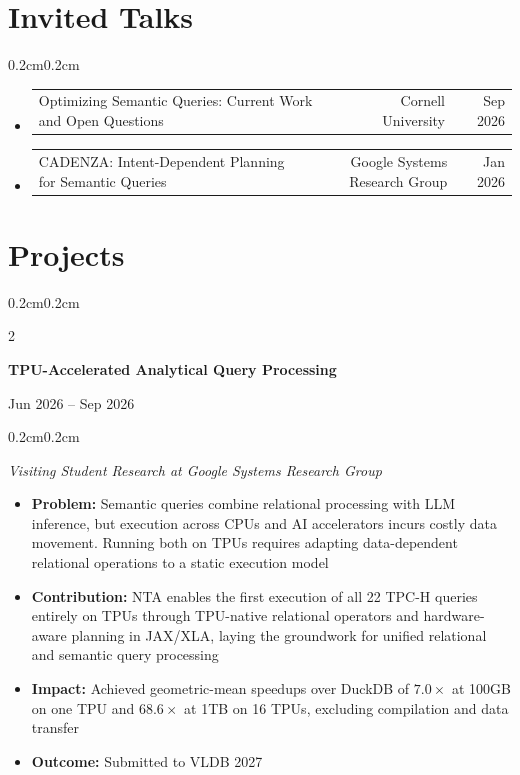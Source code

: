 \documentclass[10pt, letterpaper]{article}
\newenvironment{highlights}[1][]{
    \begin{itemize}[
        topsep=0.10cm,
        parsep=0.10cm,
        partopsep=0pt,
        itemsep=0pt,
        leftmargin=0.4cm+10pt,
        #1
    ]
}{
    \end{itemize}
}
\newenvironment{onecolentry}{
    \begin{adjustwidth}{0.2cm}{0.2cm}
}{
    \end{adjustwidth}
}
\newenvironment{twocolentry}[2][]{
    \onecolentry
    \def\secondColumn{#2}
    \setcolumnwidth{\fill, 4.5cm}
    \begin{paracol}{2}
}{
    \switchcolumn \raggedleft \secondColumn
    \end{paracol}
    \endonecolentry
}
\begin{document}
\section*{Invited Talks}

\begin{onecolentry}
\begin{itemize}[leftmargin=0.4cm]
    \item
    \begin{tabularx}{0.97\textwidth}{X r r}
        Optimizing Semantic Queries: Current Work and Open Questions & Cornell University & Sep 2026
    \end{tabularx}

    \item
    \begin{tabularx}{0.97\textwidth}{X r r}
        CADENZA: Intent-Dependent Planning for Semantic Queries & Google Systems Research Group & Jan 2026
    \end{tabularx}
\end{itemize}
\end{onecolentry}

\section*{Projects}

\begin{twocolentry}{Jun 2026 -- Sep 2026}
\textbf{TPU-Accelerated Analytical Query Processing}
\end{twocolentry}
\begin{onecolentry}
\textit{Visiting Student Research at Google Systems Research Group}
\begin{highlights}[parsep=0pt]
    \item \textbf{Problem:} Semantic queries combine relational processing with LLM inference, but execution across CPUs and AI accelerators incurs costly data movement. Running both on TPUs requires adapting data-dependent relational operations to a static execution model
    \item \textbf{Contribution:} NTA enables the first execution of all 22 TPC-H queries entirely on TPUs through TPU-native relational operators and hardware-aware planning in JAX/XLA, laying the groundwork for unified relational and semantic query processing
    \item \textbf{Impact:} Achieved geometric-mean speedups over DuckDB of $7.0\times$ at 100GB on one TPU and $68.6\times$ at 1TB on 16 TPUs, excluding compilation and data transfer
    \item \textbf{Outcome:} Submitted to VLDB 2027
\end{highlights}
\end{onecolentry}
\end{document}
